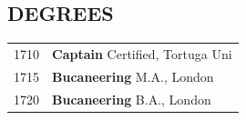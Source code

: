 \documentclass[11pt]{article}
\begin{document}
        \subsection{DEGREES} %
        \begin{tabular}{r p{}}
                {1710} %
                & \textbf{Captain} \newline %
                {Certified, Tortuga Uni} \\ %
                {1715} %
                & \textbf{Bucaneering} \newline %
                {M.A., London} \\ %
                {1720} %
                & \textbf{Bucaneering} \newline %
                {B.A., London} \\ %
        \end{tabular}
        
    

\end{document}
